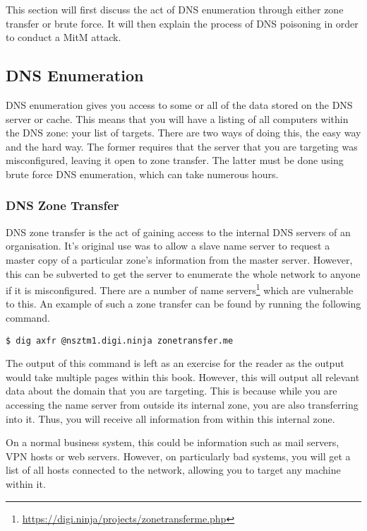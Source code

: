 		This section will first discuss the act of DNS enumeration through either zone transfer or brute force.
		It will then explain the process of DNS poisoning in order to conduct a MitM attack.

		\subsection{DNS Enumeration}
			DNS enumeration gives you access to some or all of the data stored on the DNS server or cache.
			This means that you will have a listing of all computers within the DNS zone: your list of targets.
			There are two ways of doing this, the easy way and the hard way.
			The former requires that the server that you are targeting was misconfigured, leaving it open to zone transfer.
			The latter must be done using brute force DNS enumeration, which can take numerous hours.

			\subsubsection{DNS Zone Transfer}
				DNS zone transfer is the act of gaining access to the internal DNS servers of an organisation.
				It's original use was to allow a slave name server to request a master copy of a particular zone's information from the master server.
				However, this can be subverted to get the server to enumerate the whole network to anyone if it is misconfigured.
				There are a number of name servers\footnote{\url{https://digi.ninja/projects/zonetransferme.php}} which are vulnerable to this.
				An example of such a zone transfer can be found by running the following command.
				\begin{lstlisting}[style=CLI]
					$ dig axfr @nsztm1.digi.ninja zonetransfer.me
				\end{lstlisting}
				The output of this command is left as an exercise for the reader as the output would take multiple pages within this book.
				However, this will output all relevant data about the domain that you are targeting.
				This is because while you are accessing the name server from outside its internal zone, you are also transferring into it.
				Thus, you will receive all information from within this internal zone.

				On a normal business system, this could be information such as mail servers, VPN hosts or web servers.
				However, on particularly bad systems, you will get a list of all hosts connected to the network, allowing you to target any machine within it.

